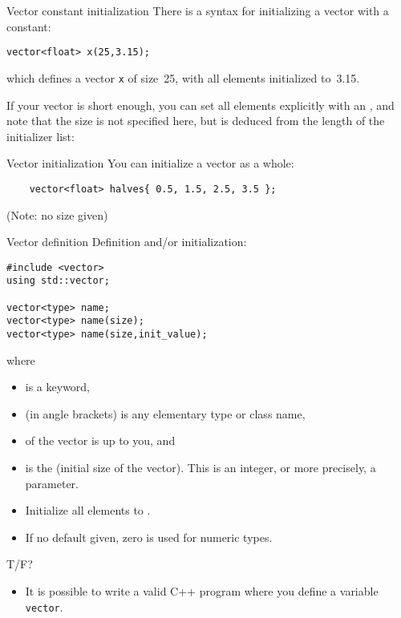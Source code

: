 \begin{slide}{Vector constant initialization}
  \label{sl:vector-initconst}
  There is a syntax for initializing a vector with a constant:
\begin{lstlisting}
vector<float> x(25,3.15);
\end{lstlisting}
which defines a vector \lstinline{x} of size~25,
with all elements initialized to~3.15.
\end{slide}

If your vector is short enough, you can set all elements explicitly with an
, and note that the size is not specified here,
but is deduced from the length of the initializer list:


\begin{slide}{Vector initialization}
  \label{sl:vector-init}
  You can initialize a vector as a whole:
  \begin{lstlisting}
    vector<float> halves{ 0.5, 1.5, 2.5, 3.5 };
  \end{lstlisting}
  (Note: no size given)
\end{slide}

\begin{slide}{Vector definition}
  \label{sl:vector-def}
  Definition and/or initialization:
  \lstset{style=snippetcode}
\begin{lstlisting}
#include <vector>
using std::vector;

vector<type> name;
vector<type> name(size);
vector<type> name(size,init_value);
\end{lstlisting}
where
\begin{itemize}
\item {} is a keyword,
\item {} (in angle brackets) is any elementary type or class
  name,
\item {} of the vector is up to you, and
\item {} is the (initial size of the vector). This is an integer,
  or more precisely, a  parameter.
\item Initialize all elements to .
\item If no default given, zero is used for numeric types.
\end{itemize}
\end{slide}

\begin{review}
  T/F? 
  \begin{itemize}
  \item It is possible to write a valid C++ program where you define a
    variable \lstinline+vector+.
  \end{itemize}
\end{review}

